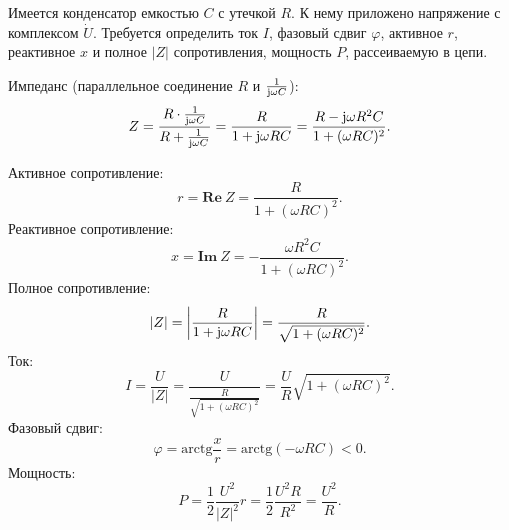     \begin{example}
        Имеется конденсатор емкостью \( C \) с утечкой \( R \). К нему приложено
        напряжение с комплексом \( \dot{U} \). Требуется определить ток \( I \),
        фазовый сдвиг \( \varphi \), активное \( r \), реактивное \( x \) и
        полное \( |Z| \) сопротивления, мощность \( P \), рассеиваемую в цепи.
    \end{example}

    \begin{solution}
        Импеданс (параллельное соединение \( R \) и 
        \( \frac{1}{\mathrm{j}\omega C} \)):
        \[
            Z =
            \frac{R\cdot\frac{1}{\mathrm{j}\omega C}}{R+\frac{1}{\mathrm{j}\omega C}} =
            \frac{R}{1 + \mathrm{j}\omega RC} =
            \frac{R - \mathrm{j}\omega R^2C}{1 + (\omega RC)^2}.
        \]
        
        Активное сопротивление:
        \[
            r = \mathbf{Re\ }Z = \frac{R}{1 + (\omega RC)^2}.
        \]
        Реактивное сопротивление:
        \[
            x = \mathbf{Im\ }Z = -\frac{\omega R^2C}{1 + (\omega RC)^2}.
        \]
        Полное сопротивление:
        \[
            |Z|=\left|\frac{R}{1 + \mathrm{j}\omega RC}\right| =
            \frac{R}{\sqrt{1 + (\omega RC)^2}}.
        \]
        Ток:
        \[
            I = \frac{U}{|Z|} = \frac{U}{\frac{R}{\sqrt{1+(\omega RC)^2}}} =
            \frac{U}{R}\sqrt{1 + (\omega RC)^2}.
        \]
        Фазовый сдвиг:
        \[
            \varphi = \mathrm{arctg}\frac{x}{r} =
            \mathrm{arctg}(-\omega RC) < 0.
        \]
        Мощность:
        \[
            P = \frac{1}{2}\frac{U^2}{|Z|^2}r = \frac{1}{2}\frac{U^2R}{R^2} =
            \frac{U^2}{R}.
        \]
    \end{solution}